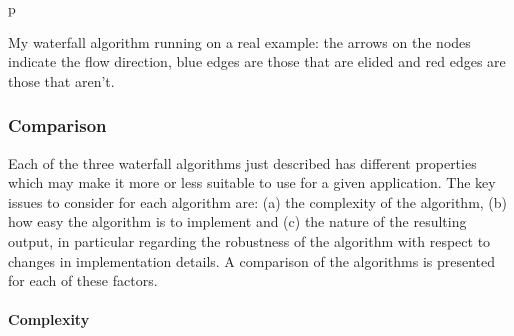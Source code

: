 \begin{stusubfig}{p}
	\hspace{4mm}%
\caption{My waterfall algorithm running on a real example: the arrows on the nodes indicate the flow direction, blue edges are those that are elided and red edges are those that aren't.}
\label{fig:segmentation-waterfall-smg-example}
\end{stusubfig}

\subsubsection{Comparison}

Each of the three waterfall algorithms just described has different properties which may make it more or less suitable to use for a given application. The key issues to consider for each algorithm are: (a) the complexity of the algorithm, (b) how easy the algorithm is to implement and (c) the nature of the resulting output, in particular regarding the robustness of the algorithm with respect to changes in implementation details. A comparison of the algorithms is presented for each of these factors.

\paragraph{Complexity}

